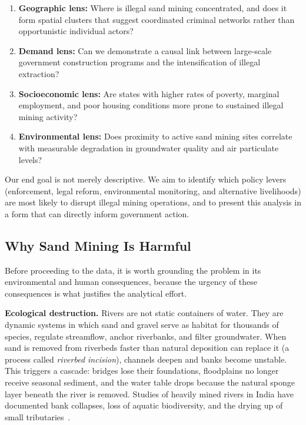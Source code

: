 \documentclass[12pt]{article}
\begin{document}
\begin{enumerate}
    \item \textbf{Geographic lens:} Where is illegal sand mining concentrated, and does it form spatial clusters that suggest coordinated criminal networks rather than opportunistic individual actors?
    \item \textbf{Demand lens:} Can we demonstrate a causal link between large-scale government construction programs and the intensification of illegal extraction?
    \item \textbf{Socioeconomic lens:} Are states with higher rates of poverty, marginal employment, and poor housing conditions more prone to sustained illegal mining activity?
    \item \textbf{Environmental lens:} Does proximity to active sand mining sites correlate with measurable degradation in groundwater quality and air particulate levels?
\end{enumerate}

Our end goal is not merely descriptive. We aim to identify which policy levers (enforcement, legal reform, environmental monitoring, and alternative livelihoods) are most likely to disrupt illegal mining operations, and to present this analysis in a form that can directly inform government action.

\subsection{Why Sand Mining Is Harmful}

Before proceeding to the data, it is worth grounding the problem in its environmental and human consequences, because the urgency of these consequences is what justifies the analytical effort.

\textbf{Ecological destruction.} Rivers are not static containers of water. They are dynamic systems in which sand and gravel serve as habitat for thousands of species, regulate streamflow, anchor riverbanks, and filter groundwater. When sand is removed from riverbeds faster than natural deposition can replace it (a process called \textit{riverbed incision}), channels deepen and banks become unstable. This triggers a cascade: bridges lose their foundations, floodplains no longer receive seasonal sediment, and the water table drops because the natural sponge layer beneath the river is removed. Studies of heavily mined rivers in India have documented bank collapses, loss of aquatic biodiversity, and the drying up of small tributaries~\cite{dharmadhikary2018}.
\end{document}
